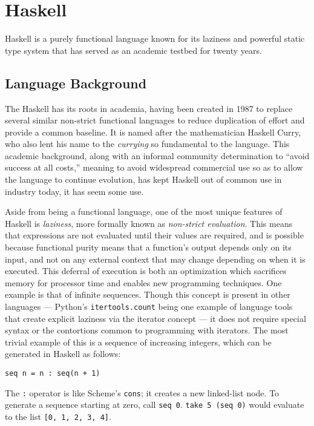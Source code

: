 \section{Haskell}

Haskell is a purely functional language known for its laziness and powerful static type system that has served as an academic testbed for twenty years.

\subsection{Language Background}

The Haskell has its roots in academia, having been created in 1987 to replace several similar non-strict functional languages to reduce duplication of effort and provide a common baseline\cite{hudak2007history}.
It is named after the mathematician Haskell Curry, who also lent his name to the \textit{currying} so fundamental to the language.
This academic background, along with an informal community determination to	``avoid success at all costs,'' meaning to avoid widespread commercial use so as to allow the language to continue evolution, has kept Haskell out of common use in industry today, it has seem some use\cite{haskellinindustry}.

Aside from being a functional language, one of the most unique features of Haskell is \textit{laziness}, more formally known as \textit{non-strict evaluation}.
This means that expressions are not evaluated until their values are required, and is possible because functional purity means that a function's output depends only on its input, and not on any external context that may change depending on when it is executed.
This deferral of execution is both an optimization which sacrifices memory for processor time and enables new programming techniques.
One example is that of infinite sequences.
Though this concept is present in other languages --- Python's \verb!itertools.count! being one example of language tools that create explicit laziness via the iterator concept\cite{pythonitertools} --- it does not require special syntax or the contortions common to programming with iterators.
The most trivial example of this is a sequence of increasing integers, which can be generated in Haskell as follows:

\begin{verbatim}
seq n = n : seq(n + 1)
\end{verbatim}

\noindent The \verb!:! operator is like Scheme's \verb!cons!; it creates a new linked-list node.
To generate a sequence starting at zero, call \verb!seq 0!.
\verb!take 5 (seq 0)! would evaluate to the list \verb![0, 1, 2, 3, 4]!.

